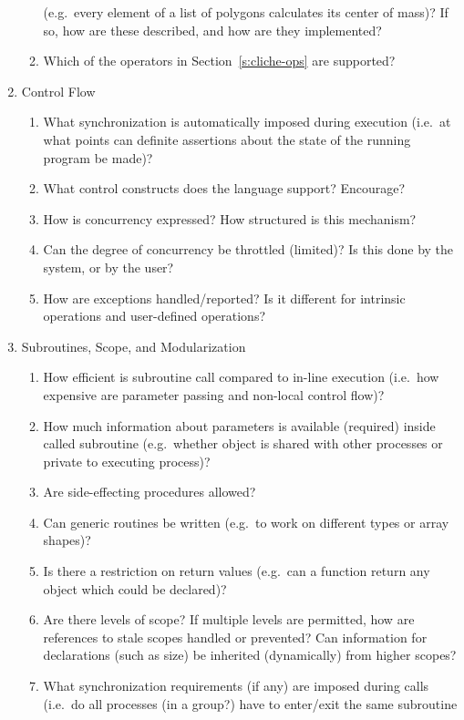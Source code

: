 \begin{enumerate}
\begin{enumerate}
	(e.g.\ every element of a list of polygons calculates its
	center of mass)?
	If so, how are these described, and how are they implemented?
  \item Which of the operators in Section~\ref{s:cliche-ops} are supported?
  \end{enumerate}
\item Control Flow
  \begin{enumerate}
  \item What synchronization is automatically imposed during execution
	(i.e.\ at what points can definite assertions about the state
	of the running program be made)?
  \item What control constructs does the language support?  Encourage?
  \item How is concurrency expressed?  How structured is this mechanism?
  \item Can the degree of concurrency be throttled (limited)?
	Is this done by the system, or by the user?
  \item How are exceptions handled/reported?
	Is it different for intrinsic operations and user-defined operations?
  \end{enumerate}
\item Subroutines, Scope, and Modularization
  \begin{enumerate}
  \item How efficient is subroutine call compared to in-line execution
	(i.e.\ how expensive are parameter passing and non-local control flow)?
  \item How much information about parameters is available (required)
	inside called subroutine
	(e.g.\ whether object is shared with other processes or private
	to executing process)?
  \item Are side-effecting procedures allowed?
  \item Can generic routines be written
	(e.g.\ to work on different types or array shapes)?
  \item Is there a restriction on return values (e.g.\ can a function return
	any object which could be declared)?
  \item Are there levels of scope?
	If multiple levels are permitted, how are references to stale scopes
	handled or prevented?
	Can information for declarations (such as size) be inherited (dynamically)
	from higher scopes?
  \item What synchronization requirements (if any) are imposed during calls
	(i.e.\ do all processes (in a group?) have to enter/exit the same subroutine

\end{enumerate}
\end{enumerate}
